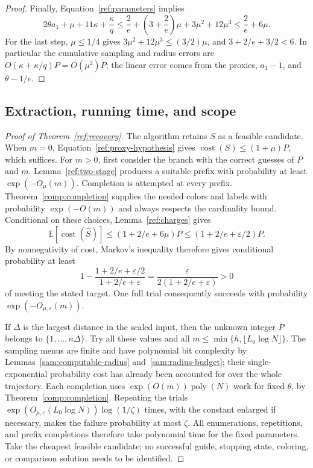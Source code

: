 \begin{proof}
Finally, Equation~\eqref{ref:parameters} implies
\[
 2\theta a_1+\mu+11\kappa+\frac\kappa q
 \le \frac2e+\left(3+\frac2e\right)\mu
                +3\mu^2+12\mu^3
 \le \frac2e+6\mu.
\]
For the last step, $\mu\le1/4$ gives
$3\mu^2+12\mu^3\le(3/2)\mu$, and $3+2/e+3/2<6$.
In particular the cumulative sampling and radius errors are
$O(\kappa+\kappa/q)P=O(\mu^2)P$; the linear error comes from the proxies,
$a_1-1$, and $\theta-1/e$.
\end{proof}

\subsection{Extraction, running time, and scope}

\begin{proof}[Proof of Theorem~\ref{ref:recovery}]
The algorithm retains $S$ as a feasible candidate.  When $m=0$,
Equation~\eqref{ref:proxy-hypothesis} gives
$\operatorname{cost}(S)\le(1+\mu)P$, which suffices.
For $m>0$, first consider the branch with the correct guesses of $P$ and
$m$.  Lemma~\ref{ref:two-stage} produces a suitable prefix with probability
at least $\exp(-O_\mu(m))$.  Completion is attempted at every prefix.
Theorem~\ref{comp:completion} supplies the needed colors and labels with
probability $\exp(-O(m))$ and always respects the cardinality bound.
Conditional on these choices, Lemma~\ref{ref:charges} gives
\[
 \mathbb E[\operatorname{cost}(\widehat S)]
 \le(1+2/e+6\mu)P
 \le(1+2/e+\varepsilon/2)P.
\]
By nonnegativity of cost, Markov's inequality therefore gives conditional
probability at least
\[
 1-\frac{1+2/e+\varepsilon/2}{1+2/e+\varepsilon}
 =\frac{\varepsilon}{2(1+2/e+\varepsilon)}>0
\]
of meeting the stated target.  One full trial consequently succeeds with
probability $\exp(-O_{\mu,\varepsilon}(m))$.

If $\Delta$ is the largest distance in the scaled input, then the unknown
integer $P$ belongs to $\{1,\ldots,n\Delta\}$.  Try all these values and
all $m\le\min\{h,\lfloor L_0\log N\rfloor\}$.
The sampling menus are finite and have polynomial bit complexity by
Lemmas~\ref{sam:computable-radius} and~\ref{sam:radius-budget}; their
single-exponential probability cost has already been accounted for over
the whole trajectory.  Each completion uses
$\exp(O(m))\operatorname{poly}(N)$ work for fixed $\theta$, by
Theorem~\ref{comp:completion}.  Repeating the trials
$\exp(O_{\mu,\varepsilon}(L_0\log N))\log(1/\zeta)$ times, with the
constant enlarged if necessary, makes the failure probability at most
$\zeta$.  All enumerations, repetitions, and prefix completions therefore
take polynomial time for the fixed parameters.  Take the cheapest feasible
candidate; no successful guide, stopping state, coloring, or comparison
solution needs to be identified.
\end{proof}

